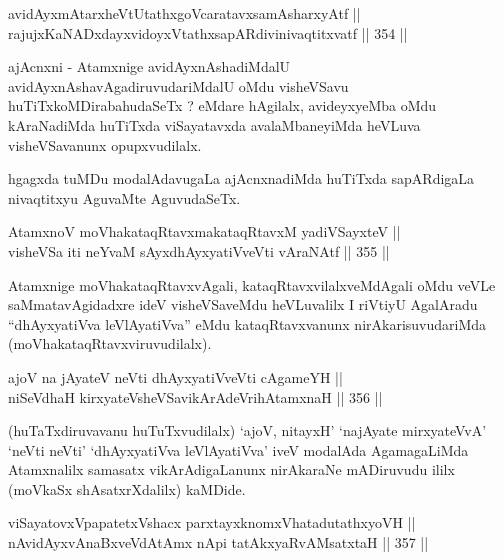 \begin{shl}
avidAyxmAtarxheVtUtathxgoVcaratavxsamAsharxyAtf || \\
rajujxKaNADxdayxvidoyxVtathxsapARdivinivaqtitxvatf \hfill || 354 ||  
\end{shl}

\begin{artha}
ajAcnxni - Atamxnige avidAyxnAshadiMdalU
avidAyxnAshavAgadiruvudariMdalU oMdu visheVSavu
huTiTxkoMDirabahudaSeTx ? eMdare hAgilalx, avideyxyeMba oMdu
kAraNadiMda huTiTxda viSayatavxda avalaMbaneyiMda heVLuva
visheVSavanunx opupxvudilalx.
\end{artha}

\begin{artha}
hgagxda tuMDu modalAdavugaLa ajAcnxnadiMda huTiTxda sapARdigaLa
nivaqtitxyu AguvaMte AguvudaSeTx.
\end{artha}


\begin{shl}
AtamxnoV moVhakataqRtavxmakataqRtavxM yadiVSayxteV || \\
visheVSa iti neYvaM sAyxdhAyxyatiVveVti vAraNAtf \hfill || 355 ||  
\end{shl}

\begin{artha}
Atamxnige moVhakataqRtavxvAgali, kataqRtavxvilalxveMdAgali oMdu veVLe
saMmatavAgidadxre ideV visheVSaveMdu heVLuvalilx I riVtiyU AgalAradu
``dhAyxyatiVva leVlAyatiVva'' eMdu kataqRtavxvanunx
nirAkarisuvudariMda (moVhakataqRtavxviruvudilalx).
\end{artha}


\begin{shl}
ajoV na jAyateV neVti dhAyxyatiVveVti cA\s \s gameYH || \\
niSeVdhaH kirxyateV\s sheVSavikArAdeVrihA\s \s tamxnaH \hfill || 356 ||  
\end{shl}

\begin{artha}
(huTaTxdiruvavanu huTuTxvudilalx) `ajoV, nitayxH' `najAyate
mirxyateVvA' `neVti neVti' `dhAyxyatiVva leVlAyatiVva' iveV modalAda
AgamagaLiMda Atamxnalilx samasatx vikArAdigaLanunx nirAkaraNe
mADiruvudu ililx (moVkaSx shAsatxrXdalilx) kaMDide.
\end{artha}

\begin{shl}
viSayatovxVpapatetxVshacx parxtayxknomxVhatadutathxyoVH ||  \\
nAvidAyxvAnaBxveVdAtAmx nApi tatAkxyaRvAMsatxtaH \hfill || 357 ||  
\end{shl}


